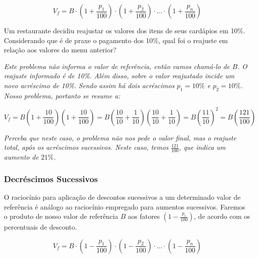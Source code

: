 \documentclass[12pt, a4paper, brazil]{abntex2}
\begin{document}
        \begin{equation*}
            \displaystyle V_f = B\cdot\left(1+\frac{p_1}{100}\right)\cdot\left(1+\frac{p_2}{100}\right)\cdot \ldots \cdot \left(1+\frac{p_n}{100}\right)
        \end{equation*}
        \bigskip
        \begin{exemplo}
            Um restaurante decidiu reajustar os valores dos itens de seus cardápios em 10\%. Considerando que é de praxe o pagamento dos 10\%, qual foi o reajuste em relação aos valores do menu anterior?

            \vspace{1em}
            \textit{Este problema não informa o valor de referência, então vamos chamá-lo de $B$. O reajuste informado é de 10\%. Além disso, sobre o valor reajustado incide um novo acréscimo de 10\%. Sendo assim há dois acréscimos $p_1=10\%$ e $p_2=10\%$. Nosso problema, portanto se resume a:}
            
            \begin{equation*}
                V_f = B\left(1+\frac{10}{100}\right)\left(1+\frac{10}{100}\right)=B\left(\frac{10}{10} + \frac{1}{10}\right)\left(\frac{10}{10} + \frac{1}{10}\right)=B\left(\frac{11}{10}\right)^{2}=B\left(\frac{121}{100}\right)
            \end{equation*}
            
            \vspace{18pt}
            \textit{Perceba que neste caso, o problema não nos pede o valor final, mas o reajuste total, após os acréscimos sucessivos. Neste caso, temos $\frac{121}{100}$, que indica um aumento de $21\%$.}
        \end{exemplo}

    \subsubsection*{Decréscimos Sucessivos}

    O raciocínio para aplicação de descontos sucessivos a um determinado valor de referência é análogo ao raciocínio empregado para aumentos sucessivos. Faremos o produto de nosso valor de referência $B$ aos fatores $\left(1-\frac{p_i}{100}\right)$, de acordo com os percentuais de desconto.
    
        \begin{equation}
            V_f=B\cdot\left(1-\frac{p_1}{100}\right)\cdot\left(1-\frac{p_2}{100}\right)\cdot \ldots \cdot \left(1-\frac{p_n}{100}\right)
        \end{equation}
\end{document}
